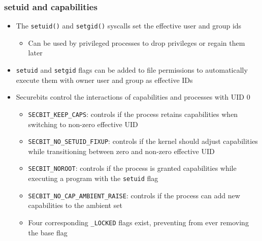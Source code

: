 \begin{frame}
	\frametitle{setuid and capabilities}
	\begin{itemize}
		\item The \texttt{setuid()} and \texttt{setgid()} syscalls set the effective
			user and group ids
			\begin{itemize}
				\item Can be used by privileged processes to drop privileges or regain
					them later
			\end{itemize}
		\item \texttt{setuid} and \texttt{setgid} flags can be added to file
			permissions to automatically execute them with owner user and group as
			effective IDs
		\item Securebits control the interactions of capabilities and processes with UID 0
			\begin{itemize}
				\item \texttt{SECBIT\_KEEP\_CAPS}: controls if the process retains
					capabilities when switching to non-zero effective UID
				\item \texttt{SECBIT\_NO\_SETUID\_FIXUP}: controls if the kernel should
					adjust capabilities while transitioning between zero and non-zero
					effective UID
				\item \texttt{SECBIT\_NOROOT}: controls if the process is granted
					capabilities while executing a program with the \texttt{setuid} flag
				\item \texttt{SECBIT\_NO\_CAP\_AMBIENT\_RAISE}: controls if the process
					can add new capabilities to the ambient set
				\item Four corresponding \texttt{\_LOCKED} flags exist, preventing from
					ever removing the base flag
			\end{itemize}
	\end{itemize}
\end{frame}

